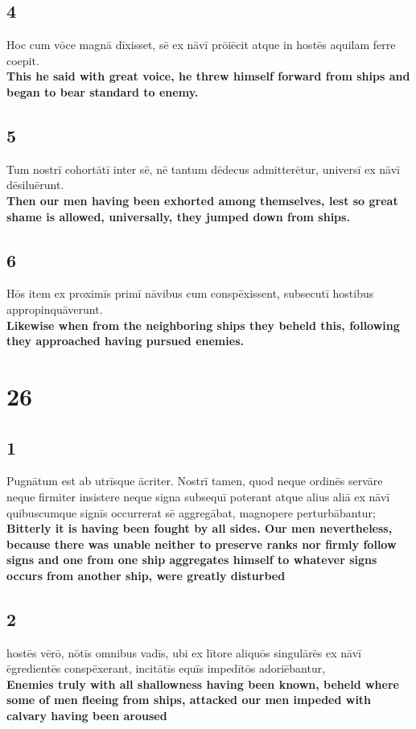 \documentclass{article}
\begin{document}
\subsection*{4}
Hoc cum vōce magnā dīxisset, sē ex nāvī prōiēcit atque in hostēs aquilam ferre coepit. \\
\textbf{This he said with great voice, he threw himself forward from ships and began to bear standard to enemy.}

\subsection*{5}
Tum nostrī cohortātī inter sē, nē tantum dēdecus admitterētur, universī ex nāvī dēsiluērunt. \\
\textbf{Then our men having been exhorted among themselves, lest so great shame is allowed, universally, they jumped down from ships.}

\subsection*{6}
Hōs item ex proximīs primī nāvibus cum conspēxissent, subsecutī hostibus appropinquāverunt.\\
\textbf{Likewise when from the neighboring ships they beheld this, following they approached having pursued enemies.}







\section*{26}

\subsection*{1}
Pugnātum est ab utrīsque ācriter. Nostrī tamen, quod neque ordinēs servāre neque firmiter insistere neque signa subsequī poterant atque alius aliā ex nāvī quibuscumque signīs occurrerat sē aggregābat, magnopere perturbābantur; \\
\textbf{Bitterly it is having been fought by all sides. Our men nevertheless, because there was unable neither to preserve ranks nor firmly follow signs and one from one ship aggregates himself to whatever signs occurs from another ship, were greatly disturbed}

\subsection*{2}
hostēs vērō, nōtīs omnibus vadīs, ubi ex lītore aliquōs singulārēs ex nāvī ēgredientēs conspēxerant, incitātīs equīs impedītōs adoriēbantur, \\
\textbf{Enemies truly with all shallowness having been known, beheld where some of men fleeing from ships, attacked our men impeded with calvary having been aroused}
\end{document}
